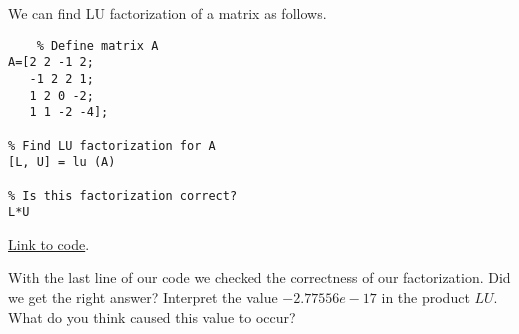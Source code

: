 \documentclass{ximera}
\begin{document}
\begin{template}\label{temp:LU}
We can find LU factorization of a matrix as follows.

\begin{verbatim}
    % Define matrix A
A=[2 2 -1 2;
   -1 2 2 1;
   1 2 0 -2;
   1 1 -2 -4];
   
% Find LU factorization for A   
[L, U] = lu (A)

% Is this factorization correct?
L*U
\end{verbatim}

\href{https://sagecell.sagemath.org/?z=eJxdi8EKAiEYhO-C7zCXhYqElG6xByE6ebXLsgcxpR9KwQyqp8_dpUsMDPMNMx2OIVIKuLta6AXNme4HBQUhoQ6cAXNqkgtNsINQP5ItQ-zHhTnrcKJ0gbGIztdc6OMq5YSYC_S8GMwWdkSP2xMrveZsOp1DofhGvbrajB5_71b4XErwlTOzsV_8KS6E&lang=octave&interacts=eJyLjgUAARUAuQ==}{Link to code}.

\begin{remark}
    With the last line of our code we checked the correctness of our factorization.  Did we get the right answer?  Interpret the value $-2.77556e-17$ in the product $LU$.  What do you think caused this value to occur?  
\end{remark}
    
\end{template}
\end{document}
